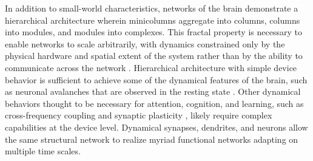 \documentclass[twocolumn]{article}
\begin{document}
\begin{figure} 
\end{figure}

In addition to small-world characteristics, networks of the brain demonstrate a hierarchical architecture wherein minicolumns aggregate into columns, columns into modules, and modules into complexes. This fractal property is necessary to enable networks to scale arbitrarily, with dynamics constrained only by the physical hardware and spatial extent of the system rather than by the ability to communicate across the network \cite{plth2006}.  Hierarchical architecture with simple device behavior is sufficient to achieve some of the dynamical features of the brain, such as neuronal avalanches \cite{be2007,frla2013} that are observed in the resting state \cite{peth2009}. Other dynamical behaviors thought to be necessary for attention, cognition, and learning, such as cross-frequency coupling \cite{heze2010} and synaptic plasticity \cite{mage2012,ab2008,fudr2005}, likely require complex capabilities at the device level. Dynamical synapses, dendrites, and neurons allow the same structural network to realize myriad functional networks adapting on multiple time scales. 
\end{document}
